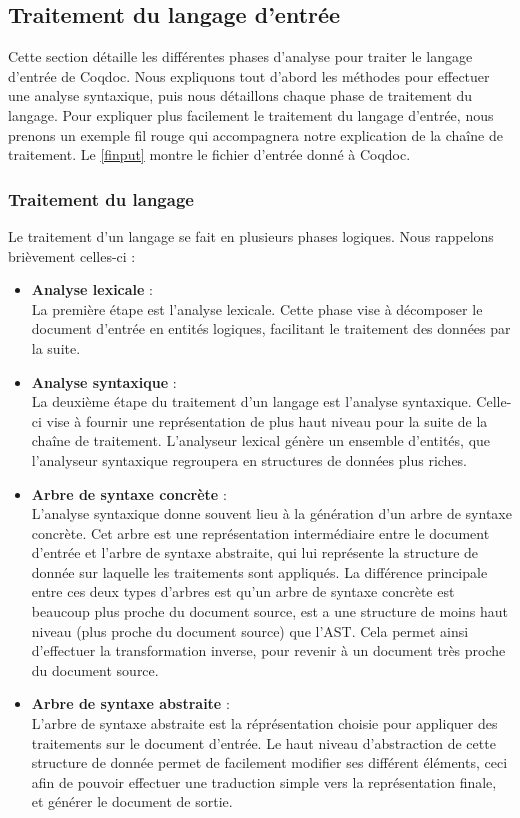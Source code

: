 \documentclass[a4paper, 11pt]{report}
\begin{document}
    \subsection{Traitement du langage d'entrée}
    Cette section détaille les différentes phases d'analyse pour traiter le
    langage d'entrée de Coqdoc. Nous expliquons tout d'abord les méthodes
    pour effectuer une analyse syntaxique, puis nous détaillons chaque phase
    de traitement du langage.
    Pour expliquer plus facilement le traitement du langage d'entrée, nous
    prenons un exemple fil rouge qui accompagnera notre explication de la
    chaîne de traitement. Le \cref{finput} montre le fichier d'entrée
    donné à Coqdoc.
    

    \subsubsection{Traitement du langage}
    \label{trait}
    Le traitement d'un langage se fait en plusieurs phases logiques. Nous
    rappelons brièvement celles-ci :
    \begin{itemize}
    \item[] \textbf{Analyse lexicale}  :\\
      La première étape est l'analyse lexicale. Cette phase vise à décomposer
      le document d'entrée en entités logiques, facilitant le traitement
      des données par la suite.
    \item[] \textbf{Analyse syntaxique} :\\
      La deuxième étape du traitement d'un langage est l'analyse syntaxique.
      Celle-ci vise à fournir une représentation de plus haut niveau pour
      la suite de la chaîne de traitement. L'analyseur lexical génère un
      ensemble d'entités, que l'analyseur syntaxique regroupera en structures
      de données plus riches.
      \item[] \textbf{Arbre de syntaxe concrète} :\\
      L'analyse syntaxique donne souvent lieu à la génération d'un arbre
      de syntaxe concrète. Cet arbre est une représentation intermédiaire
      entre le document d'entrée et l'arbre de syntaxe abstraite, qui
      lui représente la structure de donnée sur laquelle les traitements sont
      appliqués. La différence principale entre ces deux types d'arbres est
      qu'un arbre de syntaxe concrète est beaucoup plus proche du document
      source, est a une structure de moins haut niveau (plus proche du
      document source) que l'AST.  Cela permet ainsi d'effectuer la
      transformation inverse, pour revenir à un document très proche du
      document source.
      \item[] \textbf{Arbre de syntaxe abstraite} :\\
      L'arbre de syntaxe abstraite est la réprésentation choisie pour appliquer
      des traitements sur le document d'entrée. Le haut niveau d'abstraction
      de cette structure de donnée permet de facilement modifier ses différent
      éléments, ceci afin de pouvoir effectuer une traduction simple vers la
      représentation finale, et générer le document de sortie.
    \end{itemize}
\end{document}
